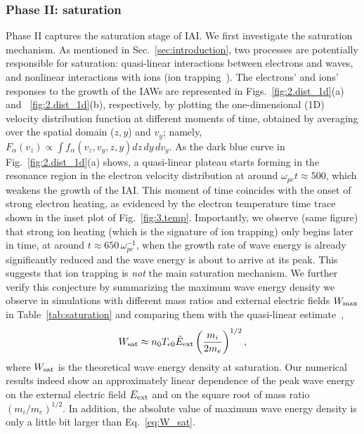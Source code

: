 \documentclass[%
 reprint,
 amsmath,
 amssymb,
 aps,
 prx,
floatfix,
superscriptaddress
]{revtex4-2}
\begin{document}
\subsubsection{\label{sec:phase2}Phase II: saturation}
Phase II captures the saturation stage of IAI. 
We first investigate the saturation mechanism. 
As mentioned in Sec.~\ref{sec:introduction}, two processes are potentially responsible for saturation: quasi-linear interactions between electrons and waves, and nonlinear interactions with ions (ion trapping~\cite{sagdeev1969nonlinear,biskamp1971computer}). 
The electrons' and ions' responses to the growth of the IAWs are represented in Figs.~\ref{fig:2.dist_1d}(a) and ~\ref{fig:2.dist_1d}(b), respectively, by plotting the one-dimensional (1D) velocity distribution function at different moments of time, obtained by averaging over the spatial domain ($z,y$) and $v_y$; namely, $F_{\alpha}(v_z) \propto \int f_{\alpha}(v_z,v_y, z,y) dz\, dy\, d v_y $. 
As the dark blue curve in Fig.~\ref{fig:2.dist_1d}(a) shows, a quasi-linear plateau starts forming in the resonance region in the electron velocity distribution at around $\omega_{pe}t\approx 500$, which weakens the growth of the IAI.
This moment of time coincides with the onset of strong electron heating, as evidenced by the electron temperature time trace shown in the inset plot of Fig.~\ref{fig:3.temp}.
Importantly, we observe (same figure) that strong ion heating (which is the signature of ion trapping) only begins later in time, at around $t\approx 650\, \omega_{pe}^{-1}$, when the growth rate of wave energy is already significantly reduced and the wave energy is about to arrive at its peak. 
This suggests that ion trapping is \textit{not} the main saturation mechanism.
We further verify this conjecture by summarizing the maximum wave energy density we observe in simulations with different mass ratios and external electric fields $W_{\rm{max}}$ in Table~\ref{tab:saturation} and comparing them with the quasi-linear estimate~\cite{zavoiski1967turbulant}, 
\begin{equation}
\label{eq:W_sat}
    W_{\rm{sat}} \approx n_0T_{e0} \tilde{E}_{\rm{ext}}\left(\frac{m_i}{2m_e}\right)^{1/2},
\end{equation}
where $W_{\rm{sat}}$ is the theoretical wave energy density at saturation.
Our numerical results indeed show an approximately linear dependence of the peak wave energy on the external electric field $E_{\rm{ext}}$ and on the square root of mass ratio $(m_i/m_e)^{1/2}$.
In addition, the absolute value of maximum wave energy density is only a little bit larger than Eq.~\eqref{eq:W_sat}.
\end{document}

